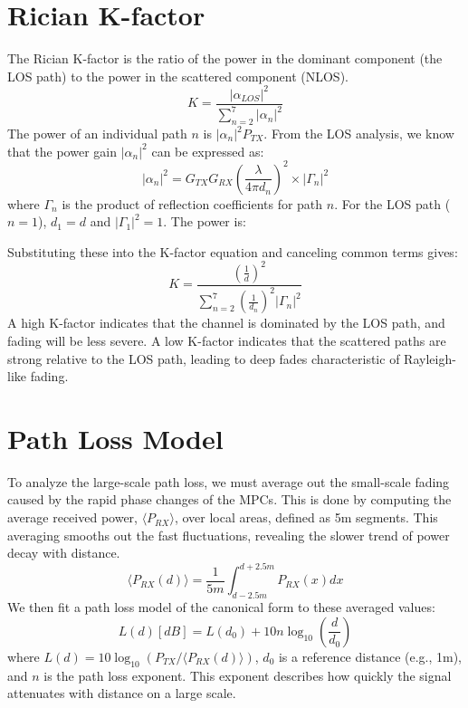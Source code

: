 \section{Rician K-factor}
The Rician K-factor is the ratio of the power in the dominant component (the LOS path) to the power in the scattered component (NLOS).
\begin{equation}
	K = \frac{|\alpha_{LOS}|^2}{\sum_{n=2}^{7} |\alpha_n|^2}
\end{equation}
The power of an individual path $n$ is $|\alpha_n|^2 P_{TX}$. From the LOS analysis, we know that the power gain $|\alpha_n|^2$ can be expressed as:
\begin{equation}
	|\alpha_n|^2 = G_{TX} G_{RX} \left( \frac{\lambda}{4\pi d_n} \right)^2 \times |\Gamma_n|^2
\end{equation}
where $\Gamma_n$ is the product of reflection coefficients for path $n$. For the LOS path ($n=1$), $d_1=d$ and $|\Gamma_1|^2=1$. The power is:

Substituting these into the K-factor equation and canceling common terms gives:
\begin{equation}
	K = \frac{\left( \frac{1}{d} \right)^2}{\sum_{n=2}^{7} \left( \frac{1}{d_n} \right)^2 |\Gamma_n|^2}
\end{equation}
A high K-factor indicates that the channel is dominated by the LOS path, and fading will be less severe. A low K-factor indicates that the scattered paths are strong relative to the LOS path, leading to deep fades characteristic of Rayleigh-like fading.

\section{Path Loss Model}
To analyze the large-scale path loss, we must average out the small-scale fading caused by the rapid phase changes of the MPCs. This is done by computing the average received power, $\langle P_{RX} \rangle$, over local areas, defined as 5m segments. This averaging smooths out the fast fluctuations, revealing the slower trend of power decay with distance.
\begin{equation}
	\langle P_{RX}(d) \rangle = \frac{1}{5m} \int_{d-2.5m}^{d+2.5m} P_{RX}(x) dx
\end{equation}
We then fit a path loss model of the canonical form to these averaged values:
\begin{equation}
	L(d) [dB] = L(d_0) + 10n \log_{10}\left(\frac{d}{d_0}\right)
\end{equation}
where $L(d) = 10 \log_{10}(P_{TX} / \langle P_{RX}(d) \rangle)$, $d_0$ is a reference distance (e.g., 1m), and $n$ is the path loss exponent. This exponent describes how quickly the signal attenuates with distance on a large scale.

